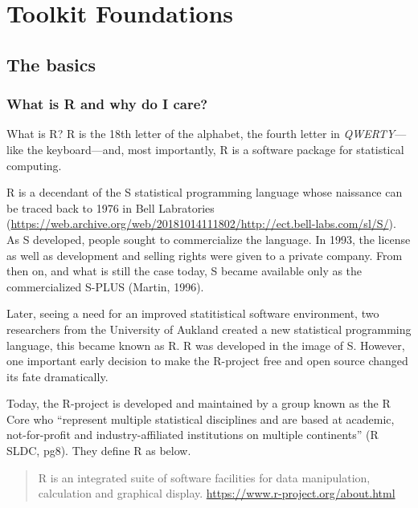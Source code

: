 \documentclass[
]{book}
\begin{document}
\hypertarget{part-toolkit-foundations}{%
\part{Toolkit Foundations}\label{part-toolkit-foundations}}

\hypertarget{the-basics}{%
\chapter{The basics}\label{the-basics}}

\hypertarget{what-is-r-and-why-do-i-care}{%
\section{What is R and why do I care?}\label{what-is-r-and-why-do-i-care}}

What is R? R is the 18th letter of the alphabet, the fourth letter in \emph{QWERTY}---like the keyboard---and, most importantly, R is a software package for statistical computing.

R is a decendant of the S statistical programming language whose naissance can be traced back to 1976 in Bell Labratories (\url{https://web.archive.org/web/20181014111802/http://ect.bell-labs.com/sl/S/}). As S developed, people sought to commercialize the language. In 1993, the license as well as development and selling rights were given to a private company. From then on, and what is still the case today, S became available only as the commercialized S-PLUS (Martin, 1996).

Later, seeing a need for an improved statitistical software environment, two researchers from the University of Aukland created a new statistical programming language, this became known as R. R was developed in the image of S. However, one important early decision to make the R-project free and open source changed its fate dramatically.

Today, the R-project is developed and maintained by a group known as the R Core who ``represent multiple statistical disciplines and are based at academic, not-for-profit and industry-affiliated institutions on multiple continents'' (R SLDC, pg8). They define R as below.

\begin{quote}
R is an integrated suite of software facilities for data manipulation, calculation and graphical display.
\url{https://www.r-project.org/about.html}
\end{quote}
\end{document}
